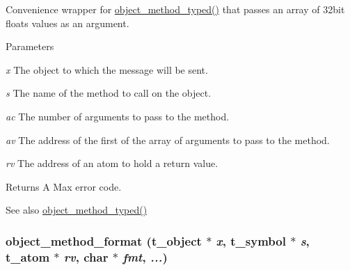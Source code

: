 Convenience wrapper for \hyperlink{group__obj_ga443dee482af22e0fe83e68955d367226}{object\_\-method\_\-typed()} that passes an array of 32bit floats values as an argument. 
\begin{DoxyParams}{Parameters}
\item[{\em x}]The object to which the message will be sent. \item[{\em s}]The name of the method to call on the object. \item[{\em ac}]The number of arguments to pass to the method. \item[{\em av}]The address of the first of the array of arguments to pass to the method. \item[{\em rv}]The address of an atom to hold a return value.\end{DoxyParams}
\begin{DoxyReturn}{Returns}
A Max error code. 
\end{DoxyReturn}
\begin{DoxySeeAlso}{See also}
\hyperlink{group__obj_ga443dee482af22e0fe83e68955d367226}{object\_\-method\_\-typed()} 
\end{DoxySeeAlso}
\hypertarget{group__obj_gab509bef31fc1bdf47c67525c0353e6d3}{
\subsubsection[{object\_\-method\_\-format}]{ object\_\-method\_\-format ({\bf t\_\-object} $\ast$ {\em x}, \/  {\bf t\_\-symbol} $\ast$ {\em s}, \/  {\bf t\_\-atom} $\ast$ {\em rv}, \/  char $\ast$ {\em fmt}, \/   {\em ...})}}
\label{group__obj_gab509bef31fc1bdf47c67525c0353e6d3}


